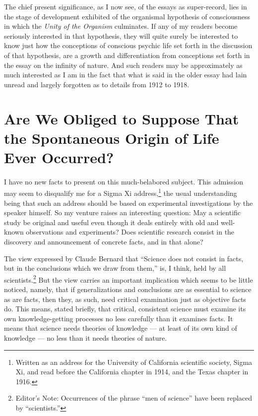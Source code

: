 \documentclass[a4paper, 11pt, oneside, polutonikogreek, english]{article}
\begin{document}
The chief present significance, as I now see, of the essays as super-record, lies in the stage of development exhibited of the organismal hypothesis of consciousness in which the \emph{Unity of the Organism} culminates. If any of my readers become seriously interested in that hypothesis, they will quite surely be interested to know just how the conceptions of conscious psychic life set forth in the discussion of that hypothesis, are a growth and differentiation from conceptions set forth in the essay on the infinity of nature. And such readers may be approximately as much interested as I am in the fact that what is said in the older essay had lain unread and largely forgotten as to details from 1912 to 1918.
\clearpage
\section{Are We Obliged to Suppose That the Spontaneous Origin of Life Ever Occurred?}
\paragraph{}
I have no new facts to present on this much-belabored subject. This admission may seem to disqualify me for a Sigma Xi address,\footnote{Written as an address for the University of California scientific society, Sigma Xi, and read before the California chapter in 1914, and the Texas chapter in 1916.} the usual understanding being that such an address should be based on experimental investigations by the speaker himself. So my venture raises an interesting question: May a scientific study be original and useful even though it deals entirely with old and well-known observations and experiments? Does scientific research consist in the discovery and announcement of concrete facts, and in that alone?

The view expressed by Claude Bernard that ``Science does not consist in facts, but in the conclusions which we draw from them,'' is, I think, held by all scientists.\footnote{Editor's Note: Occurrences of the phrase ``men of science'' have been replaced by ``scientists.''} But the view carries an important implication which seems to be little noticed, namely, that if generalizations and conclusions are as essential to science as are facts, then they, as such, need critical examination just as objective facts do. This means, stated briefly, that critical, consistent science must examine its own knowledge-getting processes no less carefully than it examines facts. It means that science needs theories of knowledge --- at least of its own kind of knowledge --- no less than it needs theories of nature.
\end{document}
